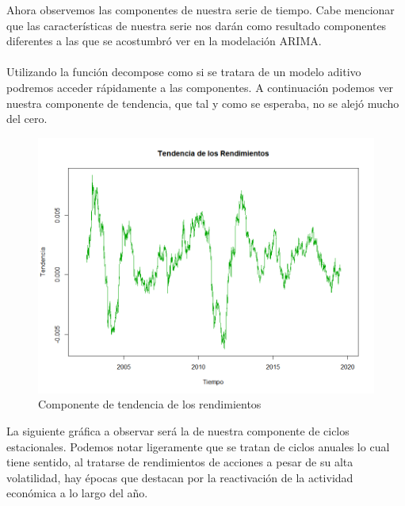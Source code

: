 Ahora observemos las componentes de nuestra serie de tiempo. Cabe mencionar que las características de nuestra serie nos darán como resultado componentes diferentes a las que se acostumbró ver en la modelación ARIMA.
\\\\
Utilizando la función decompose como si se tratara de un modelo aditivo podremos acceder rápidamente a las componentes. A continuación podemos ver nuestra componente de tendencia, que tal y como se esperaba, no se alejó mucho del cero.

\begin{figure}[!ht]
    \centering
    \includegraphics[scale=.35]{Graficos/CompRendimientos.png}
    \caption{Componente de tendencia de los rendimientos}
    \label{comp_tendencia}
\end{figure}

\newpage
La siguiente gráfica a observar será la de nuestra componente de ciclos estacionales. Podemos notar ligeramente que se tratan de ciclos anuales lo cual tiene sentido, al tratarse de rendimientos de acciones a pesar de su alta volatilidad, hay épocas que destacan por la reactivación de la actividad económica a lo largo del año.

